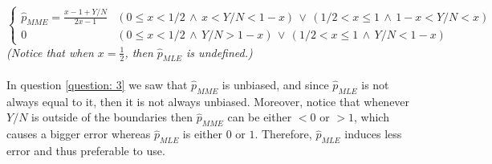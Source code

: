 \documentclass[../main.tex]{subfiles}
\begin{document}
\begin{enumerate}
\[{\begin{cases}
    \hat{p}_{MME}=\frac{x-1+Y/N}{2x-1} & \left(0\le x<1/2 \,\land\, x<Y/N<1-x\right)\,\vee\,\left(1/2<x\le1\,\land\, 1-x<Y/N<x\right)\\
    0 & \left(0\le x<1/2\, \land\, Y/N>1-x\right)\,\vee\,\left(1/2<x\le1\,\land\, Y/N<1-x\right)
    \end{cases}}\] 
    \emph{(Notice that when $x=\frac{1}{2}$, then $\hat{p}_{MLE}$ is undefined.)}\\\\
    In question \ref{question: 3} we saw that $\hat{p}_{MME}$ is unbiased, and since $\hat{p}_{MLE}$ is not always equal to it, then it is not always unbiased. Moreover, notice that whenever $Y/N$ is outside of the boundaries then $\hat{p}_{MME}$ can be either $<0$ or $>1$, which causes a bigger error whereas $\hat{p}_{MLE}$ is either $0$ or $1$. Therefore, $\hat{p}_{MLE}$ induces less error and thus preferable to use.
\end{enumerate}
\noindent\makebox[\linewidth]{\rule{\linewidth}{2pt}}
\end{document}
